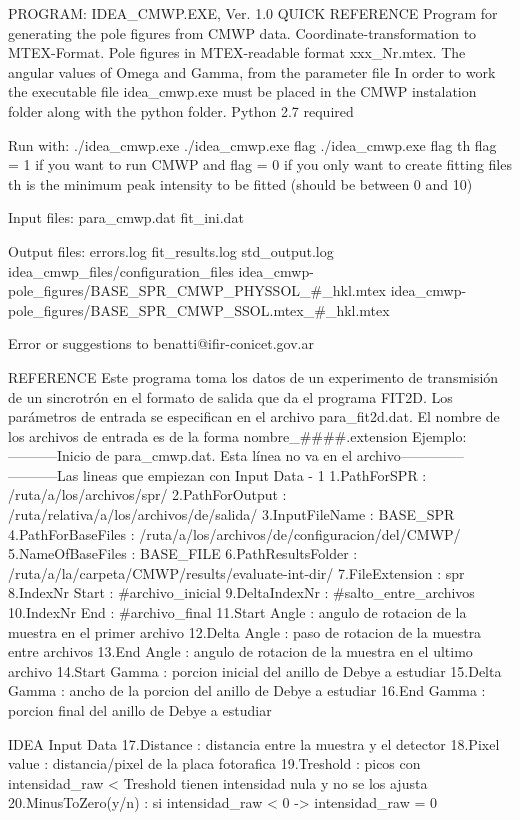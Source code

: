 PROGRAM: IDEA_CMWP.EXE, Ver. 1.0
QUICK REFERENCE
Program for generating the pole figures from CMWP data. Coordinate-transformation to MTEX-Format.
Pole figures in MTEX-readable format xxx_Nr.mtex. The angular values of Omega and Gamma, from the parameter file
In order to work the executable file idea_cmwp.exe must be placed in the CMWP instalation folder along with the python folder.
Python 2.7 required

Run with:
./idea_cmwp.exe
./idea_cmwp.exe flag
./idea_cmwp.exe flag th
flag = 1 if you want to run CMWP and flag = 0 if you only want to create fitting files
th is the minimum peak intensity to be fitted (should be between 0 and 10)

Input files:
para_cmwp.dat
fit_ini.dat

Output files:
errors.log
fit_results.log
std_output.log
idea_cmwp_files/configuration_files
idea_cmwp-pole_figures/BASE_SPR_CMWP_PHYSSOL_#_hkl.mtex
idea_cmwp-pole_figures/BASE_SPR_CMWP_SSOL.mtex_#_hkl.mtex

Error or suggestions to benatti@ifir-conicet.gov.ar

REFERENCE
Este programa toma los datos de un experimento de transmisión de un sincrotrón en el formato de salida que da el programa FIT2D.
Los parámetros de entrada se especifican en el archivo para_fit2d.dat. El nombre de los archivos de entrada es de la forma nombre_####.extension
Ejemplo:
-----------Inicio de para_cmwp.dat. Esta línea no va en el archivo--------------
-----------Las lineas que empiezan con %
Input Data - 1
1.PathForSPR        : /ruta/a/los/archivos/spr/
2.PathForOutput     : /ruta/relativa/a/los/archivos/de/salida/
3.InputFileName     : BASE_SPR
4.PathForBaseFiles  : /ruta/a/los/archivos/de/configuracion/del/CMWP/
5.NameOfBaseFiles   : BASE_FILE
6.PathResultsFolder : /ruta/a/la/carpeta/CMWP/results/evaluate-int-dir/
7.FileExtension     : spr
8.IndexNr Start     : #archivo_inicial
9.DeltaIndexNr      : #salto_entre_archivos
10.IndexNr End      : #archivo_final
11.Start Angle      : angulo de rotacion de la muestra en el primer archivo
12.Delta Angle      : paso de rotacion de la muestra entre archivos
13.End Angle        : angulo de rotacion de la muestra en el ultimo archivo
14.Start Gamma      : porcion inicial del anillo de Debye a estudiar
15.Delta Gamma      : ancho de la porcion del anillo de Debye a estudiar
16.End Gamma        : porcion final del anillo de Debye a estudiar

IDEA Input Data
17.Distance         : distancia entre la muestra y el detector
18.Pixel value      : distancia/pixel de la placa fotorafica
19.Treshold         : picos con intensidad_raw < Treshold tienen intensidad nula y no se los ajusta
20.MinusToZero(y/n) : si intensidad_raw < 0 -> intensidad_raw = 0

